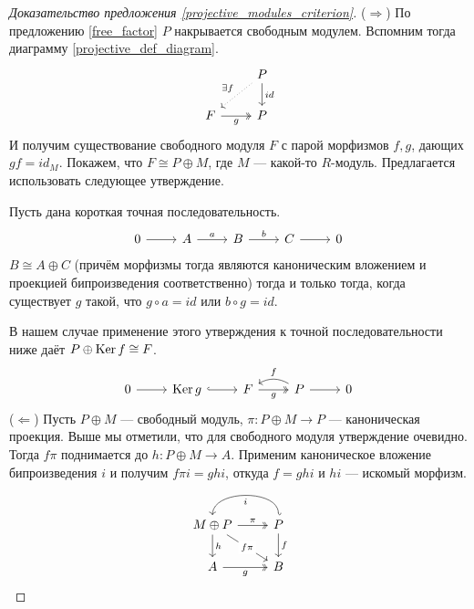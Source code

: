 \documentclass[../main.tex]{subfiles}
\begin{document}
\begin{proof}[Доказательство предложения \ref{projective_modules_criterion}]
    ($\Rightarrow$) По предложению \ref{free_factor} $P$ накрывается свободным модулем. Вспомним тогда диаграмму \eqref{projective_def_diagram}.
    \begin{equation*}
        \begin{tikzcd}
	& P \\
	F & P
	\arrow["g"', two heads, from=2-1, to=2-2]
	\arrow["id", from=1-2, to=2-2]
	\arrow["{\exists f}"', dotted, from=1-2, to=2-1]
\end{tikzcd}
    \end{equation*}
    И получим существование свободного модуля $F$ с парой морфизмов $f, g$, дающих $gf=id_M$. Покажем, что $F\cong P\oplus M$, где $M$ --- какой-то $R$-модуль. Предлагается использовать следующее утверждение.
    \begin{to_suj}\label{1:split_lemma}
    Пусть дана короткая точная последовательность.
    \begin{equation*}
        \begin{tikzcd}
	0 & A & B & C & 0
	\arrow[from=1-1, to=1-2]
	\arrow["a", from=1-2, to=1-3]
	\arrow["b", from=1-3, to=1-4]
	\arrow[from=1-4, to=1-5]
\end{tikzcd}
    \end{equation*}
    $B\cong A\oplus C$ (причём морфизмы тогда являются каноническим вложением и проекцией бипроизведения соответственно) тогда и только тогда, когда существует $g$ такой, что $g\circ a = id$ или $b\circ g = id$.
    \end{to_suj}
    В нашем случае применение этого утверждения к точной последовательности ниже даёт $P\oplus \mathop{\mathrm{Ker}}\nolimits f \cong F$.
    \begin{equation*}
        \begin{tikzcd}
	0 & {\Ker g} & F & P & 0
	\arrow[from=1-1, to=1-2]
	\arrow[hook, from=1-2, to=1-3]
	\arrow["g"', two heads, from=1-3, to=1-4]
	\arrow[from=1-4, to=1-5]
	\arrow["f"', bend right, from=1-4, to=1-3]
\end{tikzcd}
    \end{equation*}
($\Leftarrow$) Пусть $P\oplus M$ --- свободный модуль, $\pi: P\oplus M \to P$ --- каноническая проекция. Выше мы отметили, что для свободного модуля утверждение очевидно. Тогда $f\pi$ поднимается до $h:P\oplus M \to A$. Применим каноническое вложение бипроизведения $i$ и получим $f\pi i = ghi$, откуда $f = ghi$ и $hi$ --- искомый морфизм.
    \begin{equation*}
        \begin{tikzcd}
	{M\oplus P} & P \\
	A & B
	\arrow["g"', two heads, from=2-1, to=2-2]
	\arrow["f", from=1-2, to=2-2]
	\arrow["\pi", two heads, from=1-1, to=1-2]
	\arrow["i", bend right=90, hook', from=1-2, to=1-1]
	\arrow["h", from=1-1, to=2-1]
	\arrow["f\pi"{description}, from=1-1, to=2-2]
\end{tikzcd}
    \end{equation*}
\end{proof}
\end{document}
